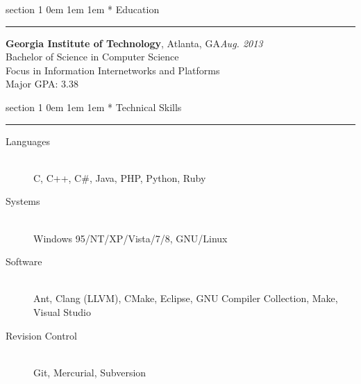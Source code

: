 \documentclass{article}
\makeatletter
\newcommand{\name}[1]{\def \@name {#1}}
\newcommand{\streetaddress}[1]{\def \@streetaddress {#1}}
\newcommand{\citystatezip}[1]{\def \@citystatezip {#1}}
\newcommand{\phone}[1]{\def \@phone {#1}}
\newcommand{\email}[1]{\def \@email {#1}}
\newcommand{\website}[1]{\def \@website {#1}}
\renewcommand{\section}[1]{
	\vspace{0.75em}
	\@startsection
	{section}
	{1}
	{\z@}
	{0em}
	{1em \@minus 1em} %
	{\normalfont\large\sc\bfseries}
	*
	{#1}
	\vspace{-0.75em} %
	\hrule
	\par
}
\newcommand{\entry}[1]{\def \@entry {#1}}
\newcommand{\dates}[1]{\def \@dates {#1}}
\newcommand{\location}[1]{\def \@location {#1}}
\newenvironment{locationentry}{
	\vspace{0.5em}
	{\bf \@entry}, \@location \hfill {\it \@dates} \\
}{}
\makeatother
\begin{document}
\name{Robert Kernan}
\phone{(770) 355-4050}
\streetaddress{16 Arbor Way Drive}
\citystatezip{Decatur, GA 30030}
\email{rkernan@gmail.com}
\website{robertkernan.com}

\maketitle

\thispagestyle{empty}


\section{Education}


\entry{Georgia Institute of Technology}
\location{Atlanta, GA}
\dates{Aug. 2013}
\begin{locationentry}
	Bachelor of Science in Computer Science \\
	Focus in Information Internetworks and Platforms \\
	Major GPA: 3.38 \\
\end{locationentry}

\section{Technical Skills}
\vspace{0.5em}
\begin{description}
	\item[Languages] \hfill \\
		C, C++, C\#, Java, PHP, Python, Ruby
	\item[Systems] \hfill \\
		Windows 95/NT/XP/Vista/7/8, GNU/Linux
	\item[Software] \hfill \\
		Ant, Clang (LLVM), CMake, Eclipse, GNU Compiler Collection, Make, Visual
		Studio
	\item[Revision Control] \hfill \\
		Git, Mercurial, Subversion
\end{description}
\end{document}
